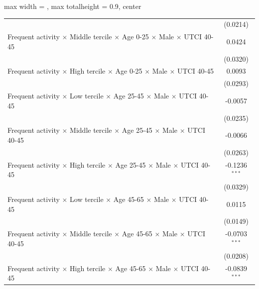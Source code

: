 \begin{table}[htbp]
\begin{adjustbox}{max width = \textwidth, max totalheight = 0.9\textheight, center}
\begin{tabular}{lc}
                                                                                                               & (0.0214)\\   
         Frequent activity $\times$ Middle tercile $\times$ Age 0-25 $\times$ Male $\times$ UTCI 40-45         & 0.0424\\   
                                                                                                               & (0.0320)\\   
         Frequent activity $\times$ High tercile $\times$ Age 0-25 $\times$ Male $\times$ UTCI 40-45           & 0.0093\\   
                                                                                                               & (0.0293)\\   
         Frequent activity $\times$ Low tercile $\times$ Age 25-45 $\times$ Male $\times$ UTCI 40-45           & -0.0057\\   
                                                                                                               & (0.0235)\\   
         Frequent activity $\times$ Middle tercile $\times$ Age 25-45 $\times$ Male $\times$ UTCI 40-45        & -0.0066\\   
                                                                                                               & (0.0263)\\   
         Frequent activity $\times$ High tercile $\times$ Age 25-45 $\times$ Male $\times$ UTCI 40-45          & -0.1236$^{***}$\\   
                                                                                                               & (0.0329)\\   
         Frequent activity $\times$ Low tercile $\times$ Age 45-65 $\times$ Male $\times$ UTCI 40-45           & 0.0115\\   
                                                                                                               & (0.0149)\\   
         Frequent activity $\times$ Middle tercile $\times$ Age 45-65 $\times$ Male $\times$ UTCI 40-45        & -0.0703$^{***}$\\   
                                                                                                               & (0.0208)\\   
         Frequent activity $\times$ High tercile $\times$ Age 45-65 $\times$ Male $\times$ UTCI 40-45          & -0.0839$^{***}$\\   

\end{tabular}
\end{adjustbox}
\end{table}
